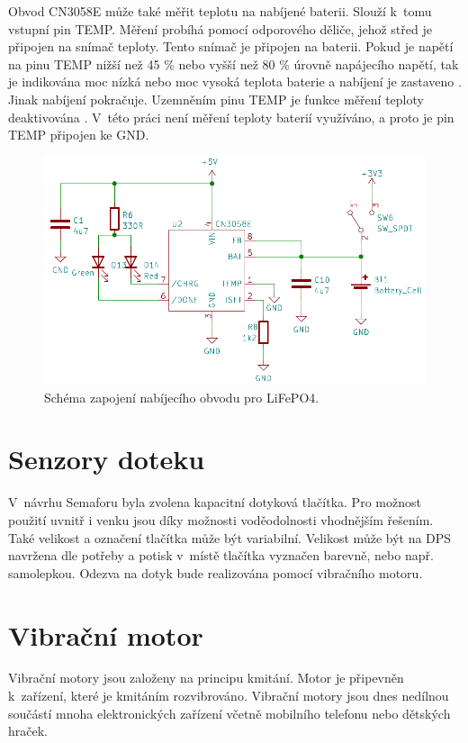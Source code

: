 Obvod CN3058E může také měřit teplotu na nabíjené baterii. Slouží k~tomu vstupní pin TEMP. Měření probíhá pomocí odporového děliče, jehož střed je připojen na snímač 
teploty. Tento snímač je připojen na baterii. Pokud je napětí na pinu TEMP nižší než 45 \% nebo vyšší než 80 \% úrovně napájecího napětí, tak je indikována moc nízká
nebo moc vysoká teplota baterie a nabíjení je zastaveno \cite{charger_dtsh}. Jinak nabíjení pokračuje. Uzemněním pinu TEMP je funkce měření teploty deaktivována 
\cite{charger_dtsh}. V~této práci není měření teploty baterií využíváno, a proto je pin TEMP připojen ke GND. 

\begin{figure}[!h]
  \begin{center}
    \includegraphics[scale=0.6]{obrazky/CN3058E.png}
  \end{center}
  \caption[Schéma zapojení nabíjecího obvodu pro LiFePO4]{Schéma zapojení nabíjecího obvodu pro LiFePO4.}
\end{figure}

\section{Senzory doteku}
V~návrhu Semaforu byla zvolena kapacitní dotyková tlačítka. Pro možnost použití uvnitř i venku jsou díky možnosti voděodolnosti 
vhodnějším řešením. Také velikost a označení tlačítka může být variabilní. Velikost může být na DPS navržena dle potřeby a potisk
v~místě tlačítka vyznačen barevně, nebo např. samolepkou. Odezva na dotyk bude realizována pomocí vibračního motoru.

\section{Vibrační motor}
Vibrační motory jsou založeny na principu kmitání. Motor je připevněn k~zařízení, které je kmitáním rozvibrováno. Vibrační motory jsou dnes 
nedílnou součástí mnoha elektronických zařízení včetně mobilního telefonu nebo dětských hraček. 

